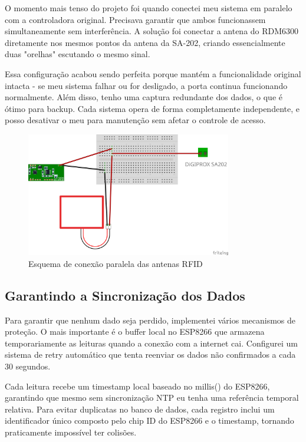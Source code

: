 O momento mais tenso do projeto foi quando conectei meu sistema em paralelo com a controladora original. Precisava garantir que ambos funcionassem simultaneamente sem interferência. A solução foi conectar a antena do RDM6300 diretamente nos mesmos pontos da antena da SA-202, criando essencialmente duas "orelhas" escutando o mesmo sinal.

Essa configuração acabou sendo perfeita porque mantém a funcionalidade original intacta - se meu sistema falhar ou for desligado, a porta continua funcionando normalmente. Além disso, tenho uma captura redundante dos dados, o que é ótimo para backup. Cada sistema opera de forma completamente independente, e posso desativar o meu para manutenção sem afetar o controle de acesso.

\begin{figure}[htbp!]
\centering
\includegraphics[width=0.8\textwidth]{pre-textuais/figuras/esquemaEmparalelo.jpg}
\caption{Esquema de conexão paralela das antenas RFID}
\label{fig:conexao_paralela}
\end{figure}

\subsection{Garantindo a Sincronização dos Dados}

Para garantir que nenhum dado seja perdido, implementei vários mecanismos de proteção. O mais importante é o buffer local no ESP8266 que armazena temporariamente as leituras quando a conexão com a internet cai. Configurei um sistema de retry automático que tenta reenviar os dados não confirmados a cada 30 segundos.

Cada leitura recebe um timestamp local baseado no millis() do ESP8266, garantindo que mesmo sem sincronização NTP eu tenha uma referência temporal relativa. Para evitar duplicatas no banco de dados, cada registro inclui um identificador único composto pelo chip ID do ESP8266 e o timestamp, tornando praticamente impossível ter colisões.

